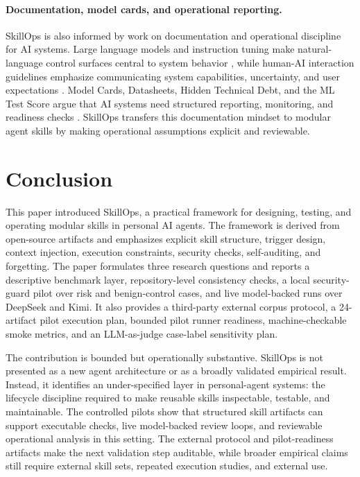 \documentclass[11pt]{article}
\begin{document}
\paragraph{Documentation, model cards, and operational reporting.}

SkillOps is also informed by work on documentation and operational discipline
for AI systems. Large language models and instruction tuning make
natural-language control surfaces central to system behavior
\citep{brown2020language,ouyang2022training}, while human-AI interaction
guidelines emphasize communicating system capabilities, uncertainty, and user
expectations \citep{amershi2019guidelines}. Model Cards, Datasheets, Hidden
Technical Debt, and the ML Test Score argue that AI systems need structured
reporting, monitoring, and readiness checks
\citep{mitchell2019modelcards,gebru2021datasheets,sculley2015hidden,breck2017mltestscore}.
SkillOps transfers this documentation mindset to modular agent skills by making
operational assumptions explicit and reviewable.

\section{Conclusion}

This paper introduced SkillOps, a practical framework for designing, testing,
and operating modular skills in personal AI agents. The framework is derived
from open-source artifacts and emphasizes explicit skill structure, trigger
design, context injection, execution constraints, security checks,
self-auditing, and forgetting. The paper formulates three research questions
and reports a descriptive benchmark layer, repository-level consistency checks,
a local security-guard pilot over risk and benign-control cases, and live
model-backed runs over DeepSeek and Kimi. It also provides a third-party
external corpus protocol, a 24-artifact pilot execution plan, bounded pilot
runner readiness, machine-checkable smoke metrics, and an LLM-as-judge
case-label sensitivity plan.

The contribution is bounded but operationally substantive. SkillOps is not
presented as a new agent architecture or as a broadly validated empirical
result. Instead, it identifies an under-specified layer in personal-agent
systems: the lifecycle discipline required to make reusable skills inspectable,
testable, and maintainable. The controlled pilots show that structured skill
artifacts can support executable checks, live model-backed review loops, and
reviewable operational analysis in this setting. The external protocol and
pilot-readiness artifacts make the next validation step auditable, while
broader empirical claims still require external skill sets, repeated execution
studies, and external use.



\end{document}
